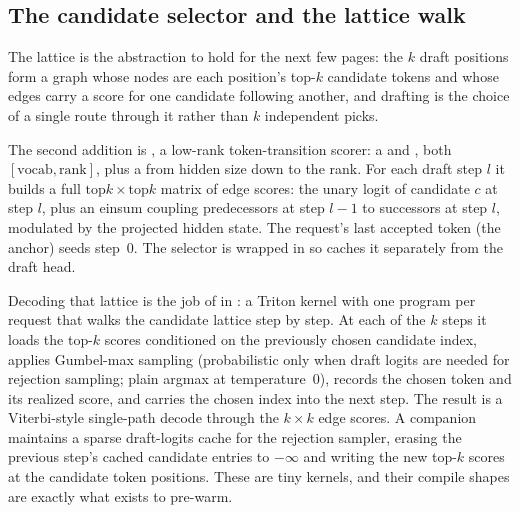 \subsection{The candidate selector and the lattice walk}

The lattice is the abstraction to hold for the next few pages: the $k$ draft
positions form a graph whose nodes are each position's top-$k$ candidate
tokens and whose edges carry a score for one candidate following another, and
drafting is the choice of a single route through it rather than $k$
independent picks.

The second addition is , a low-rank token-transition
scorer: a  and , both
$[\mathrm{vocab}, \mathrm{rank}]$, plus a  from
hidden size down to the rank. For each draft step $l$ it builds a full
$\mathrm{top}k \times \mathrm{top}k$ matrix of edge scores: the unary
logit of candidate $c$ at step $l$, plus an einsum coupling predecessors at
step $l{-}1$ to successors at step $l$, modulated by the projected hidden
state. The request's last accepted token (the anchor) seeds step~0.
The selector is wrapped in 
so  caches it separately from the draft head.

Decoding that lattice is the job of  in
: a Triton kernel with one program
per request that walks the candidate lattice step by step. At each of the
$k$ steps it loads the top-$k$ scores conditioned on the previously chosen
candidate index, applies Gumbel-max sampling (probabilistic only when draft
logits are needed for rejection sampling; plain argmax at temperature~0),
records the chosen token and its realized score, and carries the chosen
index into the next step. The result is a Viterbi-style single-path decode
through the $k \times k$ edge scores. A companion
 maintains a sparse draft-logits cache for
the rejection sampler, erasing the previous step's cached candidate entries
to $-\infty$ and writing the new top-$k$ scores at the candidate token
positions. These are tiny kernels, and their compile shapes are exactly
what  exists to pre-warm.


